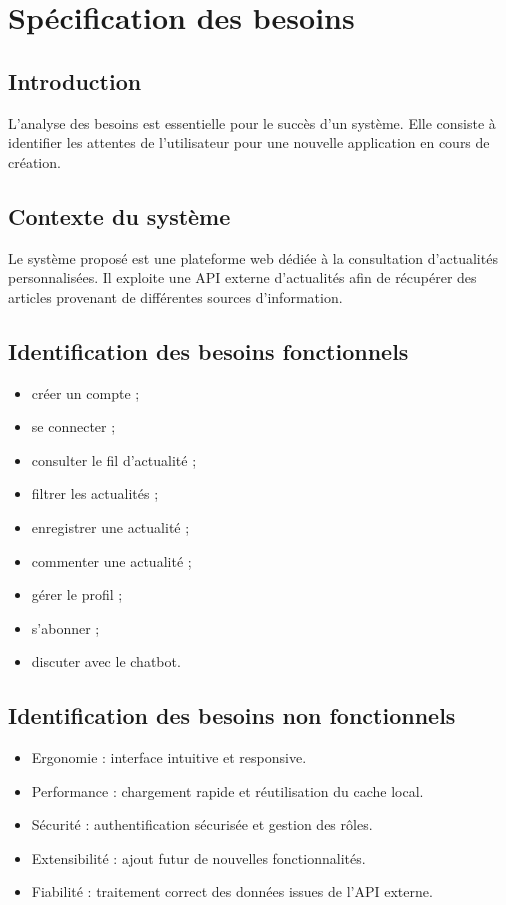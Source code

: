 \documentclass[12pt,a4paper]{report}
\begin{document}
\chapter{Spécification des besoins}
\section{Introduction}
L'analyse des besoins est essentielle pour le succès d'un système. Elle consiste à identifier les attentes de l'utilisateur pour une nouvelle application en cours de création.

\section{Contexte du système}
Le système proposé est une plateforme web dédiée à la consultation d'actualités personnalisées. Il exploite une API externe d'actualités afin de récupérer des articles provenant de différentes sources d'information.

\section{Identification des besoins fonctionnels}
\begin{itemize}
\item créer un compte ;
\item se connecter ;
\item consulter le fil d'actualité ;
\item filtrer les actualités ;
\item enregistrer une actualité ;
\item commenter une actualité ;
\item gérer le profil ;
\item s'abonner ;
\item discuter avec le chatbot.
\end{itemize}

\section{Identification des besoins non fonctionnels}
\begin{itemize}
\item Ergonomie : interface intuitive et responsive.
\item Performance : chargement rapide et réutilisation du cache local.
\item Sécurité : authentification sécurisée et gestion des rôles.
\item Extensibilité : ajout futur de nouvelles fonctionnalités.
\item Fiabilité : traitement correct des données issues de l'API externe.
\end{itemize}
\end{document}
